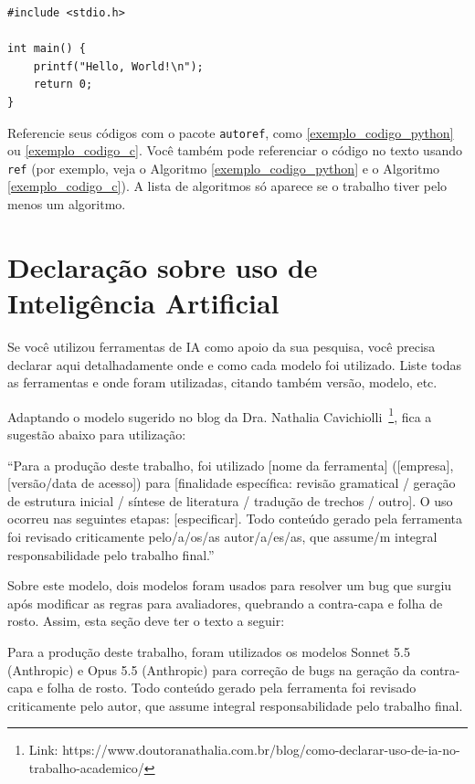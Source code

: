 \begin{algorithm}[H]
\caption{Hello World em C}
\label{exemplo_codigo_c}
\begin{verbatim}
#include <stdio.h>

int main() {
    printf("Hello, World!\n");
    return 0;
}
\end{verbatim}
\end{algorithm}

Referencie seus códigos com o pacote \texttt{autoref}, como \autoref{exemplo_codigo_python} ou \autoref{exemplo_codigo_c}. Você também pode referenciar o código no texto usando \texttt{ref} (por exemplo, veja o Algoritmo \ref{exemplo_codigo_python} e o Algoritmo \ref{exemplo_codigo_c}). A lista de algoritmos só aparece se o trabalho tiver pelo menos um algoritmo.

\section{Declaração sobre uso de Inteligência Artificial}

Se você utilizou ferramentas de IA como apoio da sua pesquisa, você precisa declarar aqui detalhadamente onde e como cada modelo foi utilizado. Liste todas as ferramentas e onde foram utilizadas, citando também versão, modelo, etc.

Adaptando o modelo sugerido no blog da Dra. Nathalia Cavichiolli~\footnote{Link: https://www.doutoranathalia.com.br/blog/como-declarar-uso-de-ia-no-trabalho-academico/}, fica a sugestão abaixo para utilização:

“Para a produção deste trabalho, foi utilizado [nome da ferramenta] ([empresa], [versão/data de acesso]) para [finalidade específica: revisão gramatical / geração de estrutura inicial / síntese de literatura / tradução de trechos / outro]. O uso ocorreu nas seguintes etapas: [especificar]. Todo conteúdo gerado pela ferramenta foi revisado criticamente pelo/a/os/as autor/a/es/as, que assume/m integral responsabilidade pelo trabalho final.”

Sobre este modelo, dois modelos foram usados para resolver um bug que surgiu após modificar as regras para avaliadores, quebrando a contra-capa e folha de rosto. Assim, esta seção deve ter o texto a seguir: 

Para a produção deste trabalho, foram utilizados os modelos Sonnet 5.5 (Anthropic) e Opus 5.5 (Anthropic) para correção de bugs na geração da contra-capa e folha de rosto. Todo conteúdo gerado pela ferramenta foi revisado criticamente pelo autor, que assume integral responsabilidade pelo trabalho final.